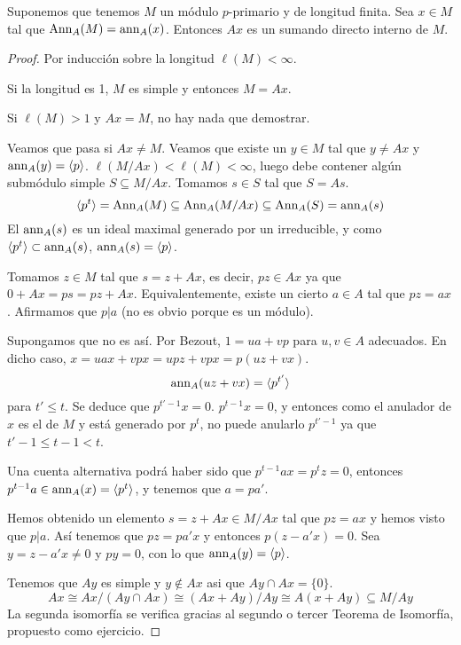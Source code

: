 \begin{prop}
  Suponemos que tenemos \(M\) un módulo \(p\)-primario y de longitud finita. Sea
  \(x\in M\) tal que \(\operatorname{Ann}_A(M)=\operatorname{ann}_A(x)\). Entonces \(Ax\) es un
  sumando directo interno de \(M\).
\end{prop}
\begin{proof}
  Por inducción sobre la longitud \(\ell(M)<\infty\).

  Si la longitud es 1, \(M\) es simple y entonces \(M=Ax\).

  Si \(\ell(M)>1\) y \(Ax=M\), no hay nada que demostrar.

  Veamos que pasa si \(Ax\neq M\). Veamos que existe un \(y \in M\)
  tal que \(y\neq Ax\) y \(\operatorname{ann}_A(y)=\langle p\rangle\).
  \(\ell(M/Ax) < \ell(M) < \infty\), luego debe contener algún
  submódulo simple \(S \subseteq M/Ax\).
  Tomamos \(s\in S\) tal que \(S=As\).
  \[
    \langle p^t\rangle =\operatorname{Ann}_A(M)\subseteq\operatorname{Ann}_A(M/Ax)\subseteq\operatorname{Ann}_A(S)
    =\operatorname{ann}_A(s)
  \]
  El \(\operatorname{ann}_A(s)\) es un ideal maximal generado por un irreducible, y como
  \(\langle p^t\rangle \subset \operatorname{ann}_A(s)\), \(\operatorname{ann}_A(s)=\langle p\rangle\).

  Tomamos \(z\in M\) tal que \(s = z + Ax\), es decir, \(pz \in Ax\) ya que
  \(0 + Ax = ps = pz + Ax\). Equivalentemente,
  existe un cierto \(a \in A\) tal que \(pz = ax\). Afirmamos que \(p|a\) (no es obvio
  porque es un módulo).

  Supongamos que no es así. Por Bezout, \(1=ua+vp\) para \(u,v\in A\)
  adecuados. En dicho caso, \(x=uax+vpx=upz+vpx=p(uz+vx)\).
  \[
    \operatorname{ann}_A(uz+vx)=\langle p^{t'}\rangle
  \]
  para \(t'\le t\). Se deduce que \(p^{t'-1} x=0\). \(p^{t-1}x=0\), y
  entonces como el anulador de \(x\) es el de \(M\) y está generado
  por \(p^t\), no puede anularlo \(p^{t'-1}\) ya que
  \(t'-1\le t-1<t\).

  Una cuenta alternativa podrá haber sido que \(p^{t-1}ax=p^t z=0\), entonces \(p^{t-1} a
  \in\operatorname{ann}_A(x)=\langle p^t\rangle\), y tenemos que \(a=pa'\).

  Hemos obtenido un elemento \(s=z+Ax\in M/Ax\) tal que \(pz=ax\) y hemos
  visto que \(p|a\). Así tenemos que \(pz=pa'x\) y entonces
  \(p(z-a'x)=0\). Sea \(y = z - a'x \neq 0\) y \(py=0\), con lo que
  \(\operatorname{ann}_A(y)=\langle p\rangle\).

  Tenemos que \(Ay\) es simple y \(y\notin Ax\) asi que \(Ay\cap Ax=
  \{0\}\).
  \[
    Ax\cong Ax/(Ay\cap Ax)\cong (Ax+Ay)/Ay\cong A(x+Ay)\subseteq M/Ay
  \]
  La segunda isomorfía se verifica gracias al segundo o tercer Teorema de Isomorfía,
  propuesto como ejercicio. 


\end{proof}
